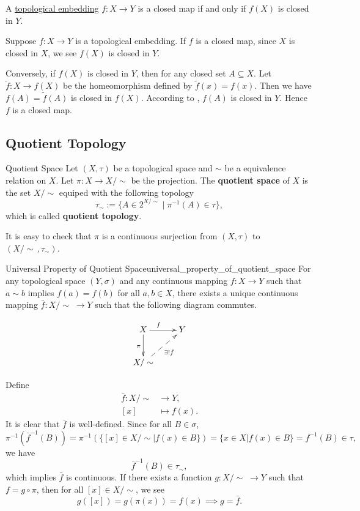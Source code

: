\documentclass{report}
\begin{document}
\begin{proposition}{}{}
	A \hyperref[topological_embedding]{topological embedding} $f:X\to Y$ is a closed map if and only if $f(X)$ is closed in $Y$.
\end{proposition}
\begin{prf}
	Suppose $f:X\to Y$ is a topological embedding. If $f$ is a closed map, since $X$ is closed in $X$, we see $f(X)$ is closed in $Y$.

	Conversely, if $f(X)$ is closed in $Y$, then for any closed set $A\subseteq X$. Let $\tilde{f}:X\to f(X)$ be the homeomorphism defined by $\tilde{f}(x)=f(x)$. Then we have $f(A)=\tilde{f}(A)$ is closed in $f(X)$. According to , $f(A)$ is closed in $Y$. Hence $f$ is a closed map.
\end{prf}

\subsection{Quotient Topology}
\begin{definition}{Quotient Space}{}
	Let $(X,\tau)$ be a topological space and $\sim$ be a equivalence relation on $X$. Let $\pi:X\to X/\sim$ be the projection.
	The \textbf{quotient space} of $X$ is the set $X/\sim$ equiped with the following topology
	\[
		\tau_\sim:=\{A\in 2^{X/\sim}\mid \pi^{-1}(A)\in \tau\},
	\]
	which is called \textbf{quotient topology}.
\end{definition}


It is easy to check that $\pi$ is a continuous surjection from $(X,\tau)$ to $(X/\sim\,,\tau_\sim)$.

\begin{proposition}{Universal Property of Quotient Space}{universal_property_of_quotient_space}
	For any topological space $(Y,\sigma)$ and any continuous mapping $f:X\to Y$ such that $a\sim b$ implies $f(a) = f(b)$ for all $a,b \in X$, there exists a unique continuous mapping $\bar{f}:X/\sim\;\to Y$ such that the following diagram commutes.

	\[\xymatrix{
		X\ar[r]^{f\quad}\ar[d]_{\pi}  &Y\\
		X/\sim\ar@{-->}[ru]_{\exists!\bar{f}}&
		}\]
\end{proposition}



\begin{prf}
	Define
	\begin{align*}
		\bar{f}:X/\sim & \longrightarrow Y, \\
		[x]            & \longmapsto f(x).
	\end{align*}
	It is clear that $\bar{f}$ is well-defined. Since for all $B\in \sigma$,
	\[
		\pi^{-1}\left(\bar{f}^{-1}(B)\right)=\pi^{-1}\left(\{[x]\in X/\sim| f(x)\in B\}\right)=\{x\in X| f(x)\in B\}=f^{-1}(B)\in \tau,
	\]
	we have
	\[
		\bar{f}^{-1}(B)\in \tau_\sim,
	\]
	which implies $\bar{f}$ is continuous. If there exists a function $g:X/\sim\;\to Y$ such that $f=g\circ\pi$, then for all $[x]\in X/\sim$, we see
	\[
		g([x])=g(\pi(x))=f(x)\implies g=\bar{f}.
	\]
\end{prf}
\end{document}
